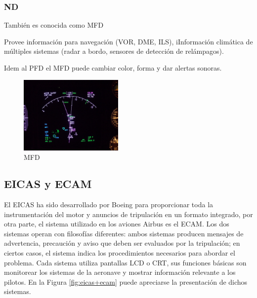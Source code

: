\subsubsection{\ac{ND}}
\label{sec:01.nd}

Tambi\'en es conocida como \ac{MFD}

    Provee informaci\'on para navegaci\'on (VOR, DME, ILS), iInformaci\'on clim\'atica de m\'ultiples sistemas (radar a bordo, sensores de detecci\'on de rel\'ampagos).

    Idem al PFD el MFD puede cambiar color, forma y dar alertas  sonoras.

    \begin{figure}[!htb]\centering
      
      \includegraphics[width=0.45\textwidth]{01.tablero.instrumentos/U01.imagenes/1.4.pantalla.electronica/Navigation_Display_(ND)_on_Boeing_747-400.jpg}
      
      \caption{MFD}
  \label{fig:01.MFD}
\end{figure}

\subsection{EICAS y ECAM}
\label{sec:01.eicas+ecam}

El \ac{EICAS} ha sido desarrollado por Boeing para proporcionar toda la instrumentación del motor y anuncios de tripulación en un formato integrado, 
por otra parte, el sistema utilizado en los aviones Airbus es el \ac{ECAM}. 
Los dos sistemas operan con filosof\'ias diferentes: ambos sistemas producen mensajes de advertencia, precaución y aviso que deben ser evaluados por la tripulación; en ciertos casos, el sistema indica los procedimientos necesarios para abordar el problema. 
Cada sistema utiliza  pantallas LCD o  CRT,  sus funciones básicas son monitorear los sistemas de la aeronave y mostrar información relevante a los pilotos. En la Figura \ref{fig:eicas+ecam} puede apreciarse la presentaci\'on de dichos sistemas.


